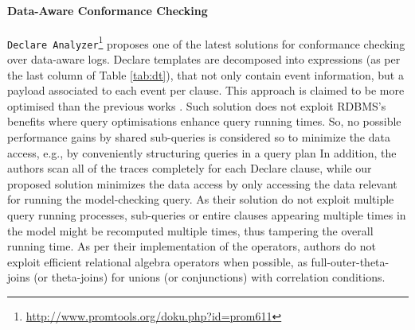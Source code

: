 \paragraph*{Data-Aware Conformance Checking}
\texttt{Declare Analyzer}\footnote{\url{http://www.promtools.org/doku.php?id=prom611}} \cite{BurattinMS16} proposes one of the latest solutions for conformance checking over data-aware logs. Declare templates are decomposed into \LTLf expressions (as per the last column of Table \ref{tab:dt}), that not only contain event information, but a payload associated to each event per clause. %
This approach is claimed to be  more optimised than the previous works \cite{VanDerAalst2005}.%
Such solution
does not exploit RDBMS's 
benefits %
where %
query optimisations enhance query running times. %
So, no possible performance gains by shared sub-queries %
is considered so to minimize the data access, e.g., by conveniently %
structuring queries in a query plan \cite{BellatrecheKB21} %
In addition, the authors
scan all of the traces completely for each Declare clause, while our proposed solution minimizes the data access by only accessing the data relevant for running the model-checking query. 
As their solution do not exploit multiple query running processes, sub-queries or entire clauses appearing multiple times in the model might be recomputed multiple times, thus tampering the overall running time.
As per their implementation of the \LTLf operators, authors do not exploit efficient relational algebra operators when possible, as full-outer-theta-joins (or theta-joins) for unions (or conjunctions) with correlation conditions.

